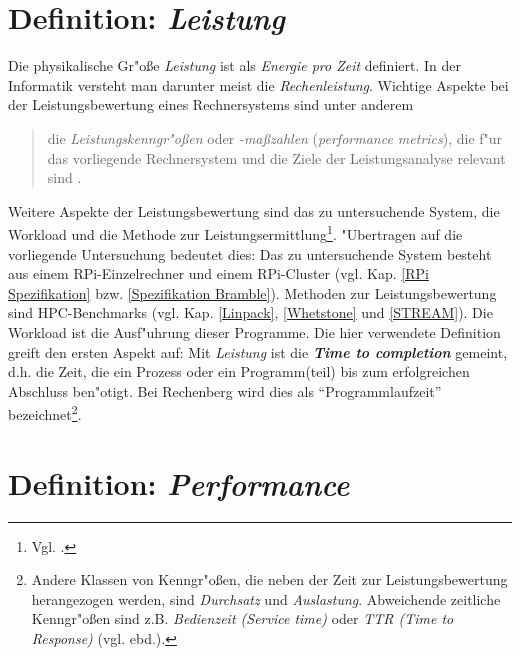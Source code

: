 \section{Definition: \textit{Leistung}}\label{Leistung}

Die physikalische Gr"o\ss e \textit{Leistung} ist als \textit{Energie pro Zeit} definiert. In der Informatik versteht man darunter meist die \textit{Rechenleistung}. Wichtige Aspekte bei der Leistungsbewertung eines Rechnersystems sind unter anderem
\begin{quote}
\onehalfspacing
[...] die \textit{Leistungskenngr"o\ss en} oder \textit{-ma\ss zahlen} (\textit{performance metrics}), die f"ur das vorliegende Rechnersystem und die Ziele der Leistungsanalyse relevant sind \cite{rec06}.
\end{quote}
Weitere Aspekte der Leistungsbewertung sind das zu untersuchende System, die Workload und die Methode zur Leistungsermittlung\footnote{Vgl. \cite{rec06}.}. "Ubertragen auf die vorliegende Untersuchung bedeutet dies: Das zu untersuchende System besteht aus einem RPi-Einzelrechner und einem RPi-Cluster (vgl. Kap. \ref{RPi Spezifikation} bzw. \ref{Spezifikation Bramble}). Methoden zur Leistungsbewertung sind HPC-Benchmarks (vgl. Kap. \ref{Linpack}, \ref{Whetstone} und \ref{STREAM}). Die Workload ist die Ausf"uhrung dieser Programme. 
Die hier verwendete Definition greift den ersten Aspekt auf: Mit \textit{Leistung} ist die \textbf{\textit{Time to completion}} gemeint, d.h. die Zeit, die ein Prozess oder ein Programm(teil) bis zum erfolgreichen Abschluss ben"otigt. Bei Rechenberg wird dies als "`Programmlaufzeit"' \cite{rec06} bezeichnet\footnote{Andere Klassen von Kenngr"o\ss en, die neben der Zeit zur Leistungsbewertung herangezogen werden, sind \textit{Durchsatz} und \textit{Auslastung}. Abweichende zeitliche Kenngr"o\ss en sind z.B. \textit{Bedienzeit (Service time)} oder \textit{TTR (Time to Response)} (vgl. ebd.).}. 

\section{Definition: \textit{Performance}}\label{Performance}

